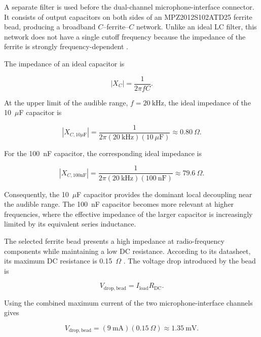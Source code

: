 A separate filter is used before the dual-channel microphone-interface connector. It consists of output capacitors on both sides of an MPZ2012S102ATD25 ferrite bead, producing a broadband $C$--ferrite--$C$ network. Unlike an ideal LC filter, this network does not have a single cutoff frequency because the impedance of the ferrite is strongly frequency-dependent \cite{TDKMPZ2012S102ATD25}.

The impedance of an ideal capacitor is

\begin{equation}
|X_C| = \frac{1}{2\pi fC}.
\end{equation}

At the upper limit of the audible range, $f=20~\mathrm{kHz}$, the ideal impedance of the 10~$\mu$F capacitor is

\begin{equation}
|X_{C,10\mu\mathrm{F}}|
=
\frac{1}
{2\pi(20~\mathrm{kHz})(10~\mu\mathrm{F})}
\approx 0.80~\Omega.
\end{equation}

For the 100~nF capacitor, the corresponding ideal impedance is

\begin{equation}
|X_{C,100\mathrm{nF}}|
=
\frac{1}
{2\pi(20~\mathrm{kHz})(100~\mathrm{nF})}
\approx 79.6~\Omega.
\end{equation}

Consequently, the 10~$\mu$F capacitor provides the dominant local decoupling near the audible range. The 100~nF capacitor becomes more relevant at higher frequencies, where the effective impedance of the larger capacitor is increasingly limited by its equivalent series inductance.

The selected ferrite bead presents a high impedance at radio-frequency components while maintaining a low DC resistance. According to its datasheet, its maximum DC resistance is 0.15~$\Omega$ \cite{TDKMPZ2012S102ATD25}. The voltage drop introduced by the bead is

\begin{equation}
V_{\mathrm{drop,bead}}
=
I_{\mathrm{load}}R_{\mathrm{DC}}.
\end{equation}

Using the combined maximum current of the two microphone-interface channels gives

\begin{equation}
V_{\mathrm{drop,bead}}
=
(9~\mathrm{mA})(0.15~\Omega)
\approx 1.35~\mathrm{mV}.
\end{equation}

